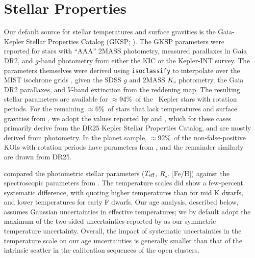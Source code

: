 \documentclass[11pt,twocolumn,tighten]{aastex63}
\newcommand{\fracstarswithprotwithbtwenty}{{$\approx$94\%}}
\newcommand{\fracstarswithprotwithoutbtwenty}{{$\approx$6\%}}
\newcommand{\frackoisnofpwithprotwithbtwenty}{{$\approx$92\%}}
\begin{document}
\section{Stellar Properties}
\label{sec:stellarprops}


Our default source for stellar temperatures and surface gravities is
the Gaia-Kepler Stellar Properties Catalog (GKSP;
\citealt{Berger_2020a_catalog}).  The GKSP parameters were reported
for stars with ``AAA'' 2MASS photometry, measured parallaxes in Gaia
DR2,  and $g$-band photometry from either the KIC or the Kepler-INT
survey.  The parameters themselves were derived using
\texttt{isoclassify} \citep{2017ApJ...844..102H} to interpolate over
the MIST isochrone grids
\citep{2016ApJ...823..102C,2016ApJS..222....8D}, given the SDSS $g$
and 2MASS $K_{\rm s}$ photometry, the Gaia DR2 parallaxes, and
$V$-band extinction from the \citet{2018MNRAS.478..651G} reddening
map.  The resulting stellar parameters are available for
\fracstarswithprotwithbtwenty\ of the \nuniqstarsantosrot\ Kepler
stars with rotation periods.  For the remaining
\fracstarswithprotwithoutbtwenty\ of stars that lack temperatures and
surface gravities from , we adopt the
values reported by \citet{Santos_2019} and \citet{Santos_2021}, which
for these cases primarily derive from the \citet{Mathur_2017} DR25
Kepler Stellar Properties Catalog, and are mostly derived from
photometry.  In the planet sample, \frackoisnofpwithprotwithbtwenty\
of the non-false-positive KOIs with rotation periods have parameters
from \citet{Berger_2020a_catalog}, and the remainder similarly are
drawn from DR25. 

\citet{David_2021} compared the photometric
 stellar parameters ($T_{\rm eff}$,
$R_\star$, [Fe/H]) against the spectroscopic parameters from
\citet{Fulton_2018}.  The temperature scales did show a few-percent
systematic difference, with \citetalias{Fulton_2018} quoting higher
temperatures than \citetalias{Berger_2020a_catalog} for mid K dwarfs,
and lower temperatures for early F dwarfs.  Our age analysis,
described below, assumes Gaussian uncertainties in effective
temperatures; we by default adopt the maximum of the two-sided
uncertainties reported by  as our
symmetric temperature uncertainty.  Overall, the impact of systematic
uncertainties in the temperature scale on our age uncertainties is
generally smaller than that of the intrinsic scatter in the
calibration sequences of the open clusters.
\end{document}
